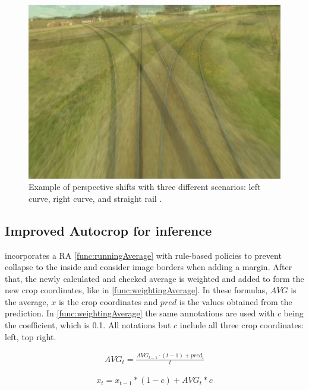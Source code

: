 \begin{figure}[H]
    \centering
    \includegraphics[width=0.7\linewidth]{PICs/Baselinepaper/perspective_shifts.jpg}
    \caption{Example of perspective shifts with three different scenarios: left curve, right curve, and straight rail \cite{tepNet2024}.}
    \label{fig:perspective_shifts}
\end{figure}

\subsection{Improved Autocrop for inference}
\label{sec:imporvedAutocrop}

\cite{tepNet2024} incorporates a \ac{RA} \autoref{func:runningAverage} with rule-based policies to prevent collapse to the inside and consider image borders when adding a margin. After that, the newly calculated and checked average is weighted and added to form the new crop coordinates, like in \autoref{func:weightingAverage}. In these formulas, $AVG$ is the average, $x$ is the crop coordinates and $pred$ is the values obtained from the prediction. In \autoref{func:weightingAverage} the same annotations are used with $c$ being the coefficient, which is 0.1. All notations but $c$ include all three crop coordinates: left, top right.

\begin{align}
    AVG_t = \frac{AVG_{t-1} \cdot (t-1) + pred_t}{t}
    \label{func:runningAverage}
\end{align}

\begin{align}
    x_{t} = x_{t-1} * (1 - c) + AVG_{t} * c
    \label{func:weightingAverage}
\end{align}

